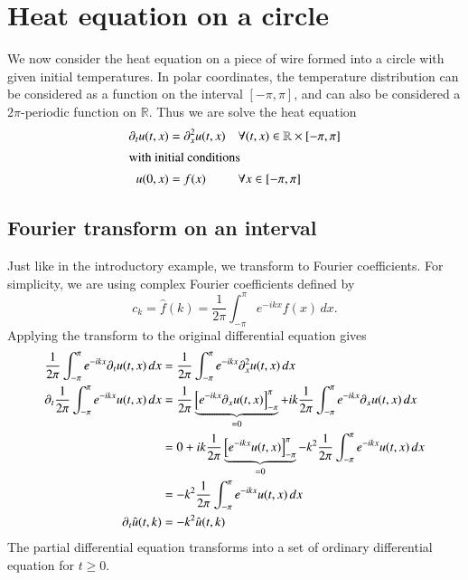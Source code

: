 %
%
%
\section{Heat equation on a circle}
We now consider the heat equation on a piece of wire formed into
a circle with given initial temperatures.
In polar coordinates, the temperature distribution can be considered
as a function on the interval $[-\pi,\pi]$, and can also be considered
a $2\pi$-periodic function on $\mathbb R$.
Thus we are solve the heat equation
\begin{align*}
\partial_t u(t,x)&=\partial_x^2 u(t,x) &&\forall(t,x)\in\mathbb R\times[-\pi,\pi]\\
\intertext{with initial conditions}
u(0,x)&=f(x)&& \forall x\in[-\pi,\pi]\\
\end{align*}

\subsection{Fourier transform on an interval}
Just like in the introductory example, we transform to Fourier coefficients.
For simplicity, we are using complex Fourier coefficients defined by
\[
c_k=\hat f(k)=\frac1{2\pi}\int_{-\pi}^{\pi}e^{-ikx}f(x)\,dx.
\]
Applying the transform to the original differential equation gives
\begin{align}
\frac1{2\pi}\int_{-\pi}^{\pi}e^{-ikx}\partial_t u(t,x)\,dx
&=\frac1{2\pi}\int_{-\pi}^{\pi}e^{-ikx}\partial_x^2 u(t,x)\,dx
\notag
\\
\partial_t\frac1{2\pi}\int_{-\pi}^{\pi}e^{-ikx} u(t,x)\,dx
&=
\frac1{2\pi}
\underbrace{
\left[
e^{-ikx}\partial_x u(t,x)
\right]_{-\pi}^{\pi}}_{=0}
+
ik\frac1{2\pi}\int_{-\pi}^{\pi}e^{-ikx}\partial_x u(t,x)\,dx
\notag
\\
&=
0 + 
ik\frac1{2\pi}
\underbrace{
\left[
e^{-ikx}u(t,x)
\right]_{-\pi}^{\pi}}_{=0}
-
k^2\frac1{2\pi}\int_{-\pi}^{\pi}e^{-ikx} u(t,x)\,dx
\notag
\\
&=
-
k^2\frac1{2\pi}\int_{-\pi}^{\pi}e^{-ikx} u(t,x)\,dx
\notag
\\
\partial_t\hat u(t,k)&=-k^2 \hat u(t,k)
\label{fouriertransformiert}
\end{align}
The partial differential equation transforms into a set of ordinary
differential equation for $t\ge 0$.

